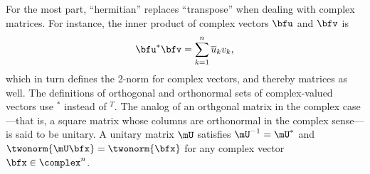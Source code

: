 For the most part, ``hermitian'' replaces ``transpose'' when dealing with complex matrices. For instance, the inner product of complex vectors $\bfu$ and $\bfv$ is
\begin{equation}
  \label{eq:complexinnerprod}
  \bfu^* \bfv = \sum_{k=1}^n \overline{u}_k v_k,
\end{equation}
which in turn defines the 2-norm for complex vectors, and thereby
matrices as well. The definitions of orthogonal and orthonormal sets
of complex-valued vectors use ${}^*$
instead of ${}^T$. The analog of an orthgonal matrix in the complex
case---that is, a square matrix whose columns are orthonormal in the
complex sense---is said to be    \gls{unitary}. A unitary matrix $\mU$
satisfies $\mU^{-1}=\mU^*$ and $\twonorm{\mU\bfx}=\twonorm{\bfx}$ for any
complex vector $\bfx\in\complex^n$.






